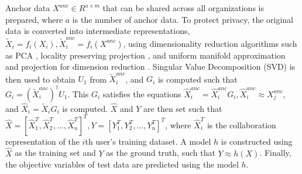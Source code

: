 \documentclass{article}
\begin{document}
Anchor data $X^{anc} \in R^{a \times m}$ that can be shared across all organizations is prepared, where $a$ is the number of anchor data. To protect privacy, the original data is converted into intermediate representations, $\tilde{X}_{i}=f_{i}(X_{i}), \tilde{X}_{i}^{anc}=f_{i}(X^{anc})$, using dimensionality reduction algorithms such as PCA \cite{pearson1901liii}, locality preserving projection \cite{he2003locality}, and uniform manifold approximation and projection for dimension reduction \cite{mcinnes2018umap}. Singular Value Decomposition (SVD) is then used to obtain $U_{1}$ from $\tilde{X}_{i}^{anc}$, and $G_{i}$ is computed such that $G_{i} = (\tilde{X}_{i}^{anc})^{\dag} U_{1}$. This $G_{i}$ satisfies the equations $\hat{X}_{i}^{anc}=\hat{X}_{i}^{anc}{G_{i}}, \hat{X}_{i}^{anc} \approx{X}_{j}^{anc}$, and $\hat{X}_{i}= \tilde{X}_{i}{G_{i}}$ is computed. $\hat{X}$ and $Y$ are then set such that $\hat{X}=[\hat{X}_{1}^{T},\hat{X}_{2}^{T},...,\hat{X}_{n}^{T}]^{T}, Y=[Y_{1}^{T},Y_{2}^{T},...,Y_{n}^{T}]^{T}$, where $\hat{X}_{i}^{T}$ is the collaboration representation of the $i$th user’s training dataset. A model $h$ is constructed using $\hat{X}$ as the training set and $Y$ as the ground truth, such that $Y \approx h(X)$. Finally, the objective variables of test data are predicted using the model $h$.

\renewcommand{\algorithmicrequire}{\textbf{Input:}}
\renewcommand{\algorithmicensure}{\textbf{Output:}}
\end{document}
